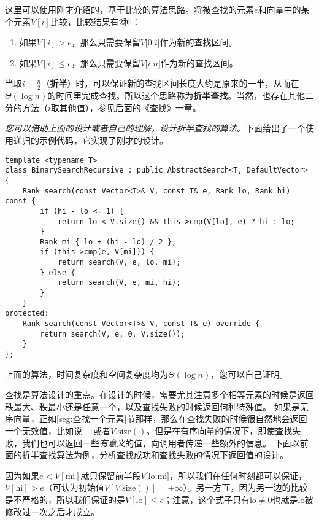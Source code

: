这里可以使用刚才介绍的，基于比较的算法思路。将被查找的元素$e$和向量中的某个元素$V[i]$比较，比较结果有2种：
\begin{enumerate}
    \item 如果$V[i] > e$，那么只需要保留$V[0$:$i]$作为新的查找区间。
    \item 如果$V[i] \le e$，那么只需要保留$V[i$:$n]$作为新的查找区间。
\end{enumerate}

当取$i = \frac n2$（\textbf{折半}）时，可以保证新的查找区间长度大约是原来的一半，从而在$\Theta(\log n)$的时间里完成查找。所以这个思路称为\textbf{折半查找}。当然，也存在其他二分的方法（$i$取其他值），参见后面的《查找》一章。

\textit{您可以借助上面的设计或者自己的理解，设计折半查找的算法。}下面给出了一个使用递归的示例代码，它实现了刚才的设计。

\begin{lstlisting}
template <typename T>
class BinarySearchRecursive : public AbstractSearch<T, DefaultVector> {
    Rank search(const Vector<T>& V, const T& e, Rank lo, Rank hi) const {
        if (hi - lo <= 1) {
            return lo < V.size() && this->cmp(V[lo], e) ? hi : lo;
        }
        Rank mi { lo + (hi - lo) / 2 };
        if (this->cmp(e, V[mi])) {
            return search(V, e, lo, mi);
        } else {
            return search(V, e, mi, hi);
        }
    }
protected:
    Rank search(const Vector<T>& V, const T& e) override {
        return search(V, e, 0, V.size());
    }
};
\end{lstlisting}

上面的算法，时间复杂度和空间复杂度均为$\Theta(\log n)$，您可以自己证明。

查找是算法设计的重点。在设计的时候，需要尤其注意多个相等元素的时候是返回秩最大、秩最小还是任意一个，以及查找失败的时候返回何种特殊值。
如果是无序向量，正如\ref{seg:查找一个元素}节那样，那么在查找失败的时候很自然地会返回一个无效值，比如说$-1$或者$V\mathrm{.size}()$。但是在有序向量的情况下，即使查找失败，我们也可以返回一些\textit{有意义}的值，向调用者传递一些额外的信息。
下面以前面的折半查找算法为例，分析查找成功和查找失败的情况下返回值的设计。

因为如果$e<V[\mathrm{mi}]$就只保留前半段$V[\mathrm{lo}$:$\mathrm{mi}]$，所以我们在任何时刻都可以保证，$V[\mathrm{hi}] > e$（可认为初始值$V[V\mathrm{.size()}] = +\infty$）。另一方面，因为另一边的比较是不严格的，所以我们保证的是$V[\mathrm{lo}]\le e$；注意，这个式子只有$\mathrm{lo}\ne 0$也就是$\mathrm{lo}$被修改过一次之后才成立。

